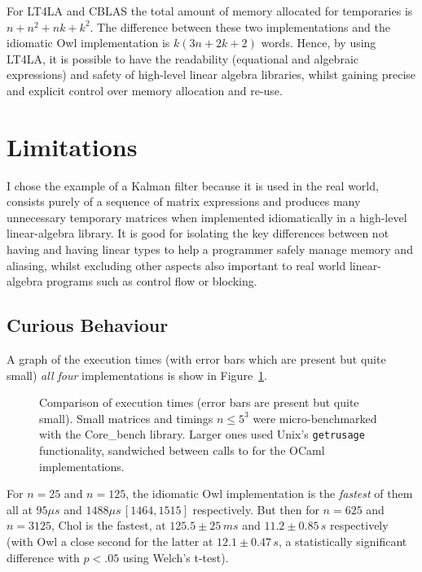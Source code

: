 For LT4LA and CBLAS the total amount of memory allocated for temporaries is $n
+ n^2 + nk + k^2$. The difference between these two implementations and the
idiomatic Owl implementation is $k(3n+2k+2)$ words. Hence, by using LT4LA, it
is possible to have the readability (equational and algebraic expressions) and
safety of high-level linear algebra libraries, whilst gaining precise and
explicit control over memory allocation and re-use.

\section{Limitations}

I chose the example of a Kalman filter because it is used in the real world,
consists purely of a sequence of matrix expressions and produces many
unnecessary temporary matrices when implemented idiomatically in a high-level
linear-algebra library. It is good for isolating the key differences between
not having and having linear types to help a programmer safely manage memory
and aliasing, whilst excluding other aspects also important to real world
linear-algebra programs such as control flow or blocking.

\subsection{Curious Behaviour}

A graph of the execution times (with error bars which are present but quite
small) \emph{all four} implementations is show in Figure~\ref{fig:timings_all}.

\begin{figure}[tp]
    \centering
    
    \caption{Comparison of execution times (error bars are present but quite
        small). Small matrices and timings $n \le 5^3$ were micro-benchmarked
        with the Core\_bench library. Larger ones used Unix's
        \texttt{getrusage} functionality, sandwiched between calls to
         for the OCaml implementations.}\label{fig:timings_all}
\end{figure}

For $n=25$ and $n=125$, the idiomatic Owl implementation is the \emph{fastest}
of them all at $95 \mu s$ and $1488 \mu s\, [1464, 1515]$ respectively. But
then for $n=625$ and $n=3125$, Chol is the fastest, at $125.5 \pm 25\, ms$ and
$11.2 \pm 0.85\, s$ respectively (with Owl a close second for the latter at
$12.1 \pm 0.47 \, s$, a statistically significant difference with $p<.05$
using Welch's t-test).

